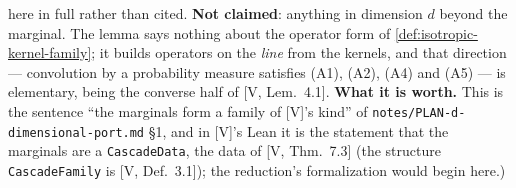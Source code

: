 \begin{lemma}
{here in full rather than cited. \textbf{Not claimed}: anything
in dimension $d$ beyond the marginal. The lemma says nothing about the operator form of
\ref{def:isotropic-kernel-family}; it builds operators on the \emph{line} from the kernels, and
that direction --- convolution by a probability measure satisfies (A1), (A2), (A4) and (A5) --- is
elementary, being the converse half of [V, Lem.~4.1]. \textbf{What it is worth.} This is the
sentence ``the marginals form a family of [V]'s kind'' of \texttt{notes/PLAN-d-dimensional-port.md}
\S 1, and in [V]'s Lean it is the statement that the marginals are a \texttt{CascadeData}, the
data of [V, Thm.~7.3] (the structure \texttt{CascadeFamily} is [V, Def.~3.1]); the
reduction's formalization would begin here.)}
\end{lemma}

